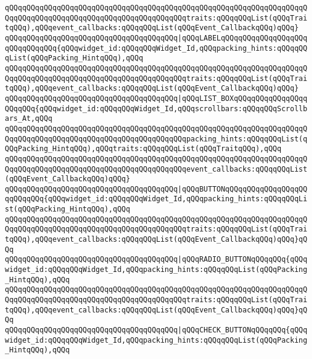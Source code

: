 \verb|qQQqqQQqqQQqqQQqqQQqqQQqqQQqqQQqqQQqqQQqqQQqqQQqqQQqqQQqqQQqqQQqqQQqqQQqqQQqqQQqqQQqqQQqqQQqqQQqqQQqqQQqqQQqqQQqtraits:qQQqqQQqList(qQQqTraitqQQq),qQQqevent_callbacks:qQQqqQQqList(qQQqEvent_CallbackqQQq)qQQq}|\newline
\verb|qQQqqQQqqQQqqQQqqQQqqQQqqQQqqQQqqQQqqQQq|\verb#|qQQqLABELqQQqqQQqqQQqqQQqqQQqqQQqqQQqqQQq{qQQqwidget_id:qQQqqQQqWidget_Id,qQQqpacking_hints:qQQqqQQqList(qQQqPacking_HintqQQq),qQQq#\newline
\verb|qQQqqQQqqQQqqQQqqQQqqQQqqQQqqQQqqQQqqQQqqQQqqQQqqQQqqQQqqQQqqQQqqQQqqQQqqQQqqQQqqQQqqQQqqQQqqQQqqQQqqQQqqQQqqQQqtraits:qQQqqQQqList(qQQqTraitqQQq),qQQqevent_callbacks:qQQqqQQqList(qQQqEvent_CallbackqQQq)qQQq}|\newline
\verb|qQQqqQQqqQQqqQQqqQQqqQQqqQQqqQQqqQQqqQQq|\verb#|qQQqLIST_BOXqQQqqQQqqQQqqQQqqQQqqQQq{qQQqwidget_id:qQQqqQQqWidget_Id,qQQqscrollbars:qQQqqQQqScrollbars_At,qQQq#\newline
\verb|qQQqqQQqqQQqqQQqqQQqqQQqqQQqqQQqqQQqqQQqqQQqqQQqqQQqqQQqqQQqqQQqqQQqqQQqqQQqqQQqqQQqqQQqqQQqqQQqqQQqqQQqqQQqqQQqpacking_hints:qQQqqQQqList(qQQqPacking_HintqQQq),qQQqtraits:qQQqqQQqList(qQQqTraitqQQq),qQQq|\newline
\verb|qQQqqQQqqQQqqQQqqQQqqQQqqQQqqQQqqQQqqQQqqQQqqQQqqQQqqQQqqQQqqQQqqQQqqQQqqQQqqQQqqQQqqQQqqQQqqQQqqQQqqQQqqQQqqQQqevent_callbacks:qQQqqQQqList(qQQqEvent_CallbackqQQq)qQQq}|\newline
\verb|qQQqqQQqqQQqqQQqqQQqqQQqqQQqqQQqqQQqqQQq|\verb#|qQQqBUTTONqQQqqQQqqQQqqQQqqQQqqQQqqQQq{qQQqwidget_id:qQQqqQQqWidget_Id,qQQqpacking_hints:qQQqqQQqList(qQQqPacking_HintqQQq),qQQq#\newline
\verb|qQQqqQQqqQQqqQQqqQQqqQQqqQQqqQQqqQQqqQQqqQQqqQQqqQQqqQQqqQQqqQQqqQQqqQQqqQQqqQQqqQQqqQQqqQQqqQQqqQQqqQQqqQQqqQQqtraits:qQQqqQQqList(qQQqTraitqQQq),qQQqevent_callbacks:qQQqqQQqList(qQQqEvent_CallbackqQQq)qQQq}qQQq|\newline
\newline
\verb|qQQqqQQqqQQqqQQqqQQqqQQqqQQqqQQqqQQqqQQq|\verb#|qQQqRADIO_BUTTONqQQqqQQq{qQQqwidget_id:qQQqqQQqWidget_Id,qQQqpacking_hints:qQQqqQQqList(qQQqPacking_HintqQQq),qQQq#\newline
\verb|qQQqqQQqqQQqqQQqqQQqqQQqqQQqqQQqqQQqqQQqqQQqqQQqqQQqqQQqqQQqqQQqqQQqqQQqqQQqqQQqqQQqqQQqqQQqqQQqqQQqqQQqqQQqqQQqtraits:qQQqqQQqList(qQQqTraitqQQq),qQQqevent_callbacks:qQQqqQQqList(qQQqEvent_CallbackqQQq)qQQq}qQQq|\newline
\verb|qQQqqQQqqQQqqQQqqQQqqQQqqQQqqQQqqQQqqQQq|\verb#|qQQqCHECK_BUTTONqQQqqQQq{qQQqwidget_id:qQQqqQQqWidget_Id,qQQqpacking_hints:qQQqqQQqList(qQQqPacking_HintqQQq),qQQq#\newline
